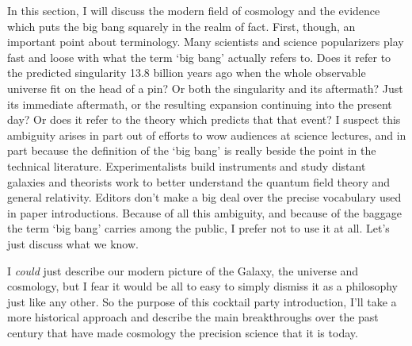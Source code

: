 In this section, I will discuss the modern field of cosmology and the evidence which puts the big bang squarely in the realm of fact. First, though, an important point about terminology. Many scientists and science popularizers play fast and loose with what the term `big bang' actually refers to. Does it refer to the predicted singularity 13.8 billion years ago when the whole observable universe fit on the head of a pin? Or both the singularity and its aftermath? Just its immediate aftermath, or the resulting expansion continuing into the present day? Or does it refer to the theory which predicts that that event? I suspect this ambiguity arises in part out of efforts to wow audiences at science lectures, and in part because the definition of the `big bang' is really beside the point in the technical literature. Experimentalists build instruments and study distant galaxies and theorists work to better understand the quantum field theory and general relativity. Editors don't make a big deal over the precise vocabulary used in paper introductions. Because of all this ambiguity, and because of the baggage the term `big bang' carries among the public, I prefer not to use it at all. Let's just discuss what we know.

I \textit{could} just describe our modern picture of the Galaxy, the universe and cosmology, but I fear it would be all to easy to simply dismiss it as a philosophy just like any other. So the purpose of this cocktail party introduction, I'll take a more historical approach and describe the main breakthroughs over the past century that have made cosmology the precision science that it is today. 

